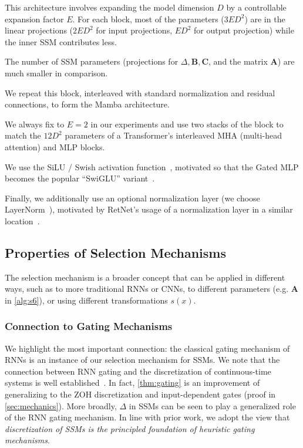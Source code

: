 This architecture involves expanding the model dimension $D$ by a controllable expansion factor $E$. For each block, most of the parameters ($3ED^2$) are in the linear projections ($2ED^2$ for input projections, $ED^2$ for output projection) while the inner SSM contributes less.

  The number of SSM parameters (projections for $\Delta, \bm{B}, \bm{C}$, and the matrix $\bm{A}$) are much smaller in comparison.

  We repeat this block, interleaved with standard normalization and residual connections, to form the Mamba architecture.

We always fix to $E=2$ in our experiments and use two stacks of the block to match the $12D^2$ parameters of a Transformer's interleaved MHA (multi-head attention) and MLP blocks.

We use the SiLU / Swish activation function~\citep{hendrycks2016gaussian,ramachandran2017swish},
motivated so that the Gated MLP becomes the popular ``SwiGLU'' variant~\citep{dauphin2017language,shazeer2020glu,chowdhery2022palm,touvron2023llama}.

Finally, we additionally use an optional normalization layer (we choose LayerNorm~\citep{ba2016layer}),
motivated by RetNet's usage of a normalization layer in a similar location~\citep{sun2023retentive}.

\subsection{Properties of Selection Mechanisms}
\label{sec:method:properties}

The selection mechanism is a broader concept that can be applied in different ways, such as to more traditional RNNs or CNNs, to different parameters (e.g. $\bm{A}$ in \ref{alg:s6}), or using different transformations $s(x)$.

  \subsubsection{Connection to Gating Mechanisms}

We highlight the most important connection: the classical gating mechanism of RNNs is an instance of our selection mechanism for SSMs. We note that the connection between RNN gating and the discretization of continuous-time systems is well established~\citep{funahashi1993approximation,tallec2018can}.
In fact, \ref{thm:gating} is an improvement of \citep{gu2021combining} generalizing to the ZOH discretization and input-dependent gates (proof in \ref{sec:mechanics}).
More broadly, $\Delta$ in SSMs can be seen to play a generalized role of the RNN gating mechanism. In line with prior work, we adopt the view that \emph{discretization of SSMs is the principled foundation of heuristic gating mechanisms}.

